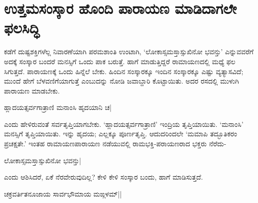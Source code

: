 \section*{ಉತ್ತಮಸಂಸ್ಕಾರ ಹೊಂದಿ ಪಾರಾಯಣ ಮಾಡಿದಾಗಲೇ ಫಲಸಿದ್ಧಿ} 

ಕಡೆಗೆ ದುಷ್ಟಶಕ್ತಿಗಳೆಲ್ಲ ನಿವಾರಣೆಯಾಗಿ ಪರಮಶಾಂತಿ ಉಂಟಾಗಿ, `ಲೋಕಾಸ್ಸಮಸ್ತಾಸ್ಸುಖಿನೋ ಭವನ್ತು' ಎನ್ನುವವರೆಗೆ ಅದಕ್ಕೆ ಸಂಸ್ಕಾರ ಬಂದರೆ ಮನಸ್ಸಿಗೆ ಒಂದು ಪಾಕ ಬರುತ್ತೆ. ಹಾಗೆ ಮಾಡುತ್ತಿದ್ದರೆ ರಾಮಾಯಣದಲ್ಲಿ ಮಧ್ಯೆ ಫಲ ಸಿಗುತ್ತದೆ. ಪಾರಾಯಣಕ್ಕೆ ಒಂದು ಹಿನ್ನೆಲೆ ಬೇಕು. ಹಿಂದಿನ ಸಂಸ್ಕಾರಕ್ಕೂ ಇಂದಿನ ಸಂಸ್ಕಾರಕ್ಕೂ ಎಷ್ಟು ವ್ಯತ್ಯಾಸವಿದೆ; ಮುಂದೆ ಹೇಗೆ ಬೆಳವಣಿಗೆಯಾಗುತ್ತೆ ಎಂಬುದನ್ನು ನೋಡಿ ಜವಾಬ್ದಾರಿ ಕೊಟ್ಟಾಯಿತು. ಅದರ ರಸದಲ್ಲಿ ಮುಳುಗಿ ಪಾರಾಯಣ ಮಾಡಬೇಕು. 


\begin{shloka} 
ಹ್ಲಾದಯತ್ಸರ್ವಗಾತ್ರಾಣಿ ಮನಾಂಸಿ ಹೃದಯಾನಿ ಚ| 
\end{shloka}

ಎಂದು ಹೇಳಿರುವಂತೆ ಸರ್ವತೃಪ್ತಿಯಾಗಬೇಕು. `ಹ್ಲಾದಯತ್ಸರ್ವಗಾತ್ರಾಣಿ' ಇಂದ್ರಿಯ ತೃಪ್ತಿಯಾಯಿತು. `ಮನಾಂಸಿ' ಮನಸ್ಸಿಗೆ ತೃಪ್ತಿಯಾಯಿತು. ಇನ್ನು ಹೃದಯ; ಎಲ್ಲಕ್ಕೂ ಪೂರ್ಣತೃಪ್ತಿ. ಆದುದರಿಂದಲೇ `ಮಮಾಪಿ ತದ್ಭೂತಿಕರಂ ಪ್ರಚಕ್ಷತೇ.' ಇಂತಹ ರಾಮಾಯಣಪಾರಾಯಣ ನಡೆಯುವಲ್ಲಿ ರಾಮಭಕ್ತಿ-ಪರಾಯಣರಾದ ಭಕ್ತರು ನೆರೆದು- 

\begin{shloka} 
ಲೋಕಾಸ್ಸಮಸ್ತಾಸ್ಸುಖಿನೋ ಭವನ್ತು|
\end{shloka}
ಎಂದು ಆಶಿಸಿದರೆ, ಏಕೆ ನೆರವೇರುವುದಿಲ್ಲ? ಕೇಳಿ ಕೇಳಿ ಸಂಸ್ಕಾರ ಬಂದು, ಹಾಗೆ ಮಾಡಿಸುತ್ತದೆ. 

\begin{shloka} 
ಚಕ್ರವರ್ತಿತನೂಜಾಯ ಸಾರ್ವಭೌಮಾಯ ಮಙ್ಗಳಮ್‍||\label{193}
\end{shloka}
